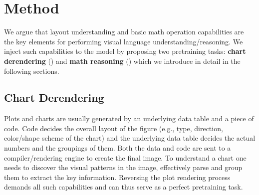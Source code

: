 
\section{Method}\label{sec:method}

We argue that layout understanding and basic math operation capabilities are the key elements for performing visual language understanding/reasoning. We inject such capabilities to the model by proposing two pretraining tasks: \textbf{chart derendering} () and \textbf{math reasoning} () which we introduce in detail in the following sections.

\subsection{Chart Derendering}\label{sec:plot_derendering}
Plots and charts are usually generated by an underlying data table and a piece of code. Code decides the overall layout of the figure (e.g., type, direction, color/shape scheme of the chart) and the underlying data table decides the actual numbers and the groupings of them. Both the data and code are sent to a compiler/rendering engine to create the final image. 
To understand a chart one needs to discover the visual patterns in the image, effectively parse and group them to extract the key information. Reversing the plot rendering process demands all such capabilities and can thus serve as a perfect pretraining task.

